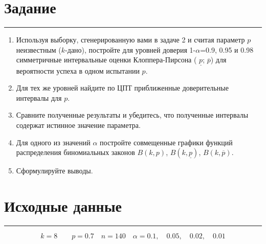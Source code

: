 \documentclass[a4paper, 14pt]{extarticle}
\begin{document}
\lstset{style=mystyle, extendedchars=\true}


\section*{Задание}\vspace{-20pt}\rule{\linewidth}{0.1mm}

\begin{enumerate}
    \item Используя выборку, сгенерированную вами в задаче 2 и считая параметр $p$ неизвестным ($k$-дано), постройте для уровней доверия 1-$\alpha$=0.9, 0.95 и 0.98 симметричные интервальные оценки Клоппера-Пирсона ( $\underline{p}$; $\overline{p}$) для вероятности успеха в одном испытании $p$.
    \item Для тех же уровней найдите по ЦПТ приближенные доверительные интервалы для $p$.
    \item Сравните полученные результаты и убедитесь, что полученные интервалы содержат истинное значение параметра.
    \item Для одного из значений $\alpha$ постройте совмещенные графики функций распределения биномиальных законов $B(k,p)$, $B(k,\underline{p})$, $B(k,\overline{p})$.
    \item Сформулируйте выводы.
\end{enumerate}

\section*{Исходные данные}\vspace{-20pt}\rule{\linewidth}{0.1mm}

\begin{equation*}
    k = 8 \qquad p = 0.7 \quad n = 140 \quad \alpha = 0.1,\quad 0.05,\quad 0.02,\quad 0.01
\end{equation*}
\end{document}
